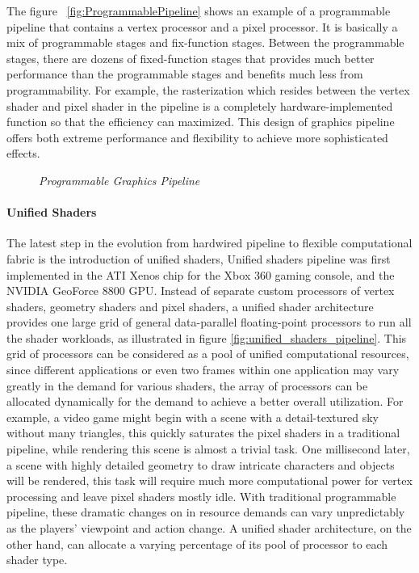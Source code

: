 The figure ~\ref{fig:ProgrammablePipeline} shows an example of a programmable pipeline that contains a vertex processor and a pixel processor. It is basically a mix of programmable stages and fix-function stages. Between the programmable stages, there are dozens of fixed-function stages that provides much better performance than the programmable stages and benefits much less from programmability. For example, the rasterization which resides between the vertex shader and pixel shader in the pipeline is a completely hardware-implemented function so that the efficiency can maximized. This design of graphics pipeline offers both extreme performance and flexibility to achieve more sophisticated effects. 

\begin{figure}[htp] 
    \centering 
    \renewcommand{\thefigure}{\thechapter.\arabic{figure}}
    \caption[Programmable Graphics Pipeline]{\emph{Programmable Graphics Pipeline}}
    \label{fig:programmable_pipeline} 
\end{figure}

\paragraph{Unified Shaders}
The latest step in the evolution from hardwired pipeline to flexible computational fabric is the introduction of unified shaders, Unified shaders pipeline was first implemented in the ATI Xenos chip for the Xbox 360 gaming console, and the NVIDIA GeoForce 8800 GPU. Instead of separate custom processors of vertex shaders, geometry shaders and pixel shaders, a unified shader architecture provides one large grid of general data-parallel floating-point processors to run all the shader workloads, as illustrated in figure \ref{fig:unified_shaders_pipeline}. This grid of processors can be considered as a pool of unified computational resources, since different applications or even two frames within one application may vary greatly in the demand for various shaders, the array of processors can be allocated dynamically for the demand to achieve a better overall utilization. For example, a video game might begin with a scene with a detail-textured sky without many triangles, this quickly saturates the pixel shaders in a traditional pipeline, while rendering this scene is almost a trivial task. One millisecond later, a scene with highly detailed geometry to draw intricate characters and objects will be rendered, this task will require much more computational power for vertex processing and leave pixel shaders mostly idle. With traditional programmable pipeline, these dramatic changes on in resource demands can vary unpredictably as the players' viewpoint and action change. A unified shader architecture, on the other hand, can allocate a varying percentage of its pool of processor to each shader type. 

